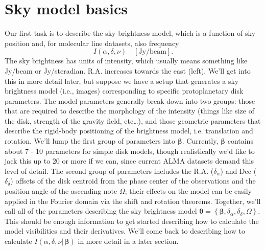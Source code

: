 \documentclass[modern]{aastex62}
\newcommand{\bbeta}{\boldsymbol{\beta}} %
\newcommand{\btheta}{\boldsymbol{\theta}} %
\begin{document}

\section{Sky model basics}
Our first task is to describe the sky brightness model, which is a function of sky position and, for molecular line datasets, also frequency
\begin{equation}
    I(\alpha, \delta, \nu) \quad [\mathrm{Jy/beam}].
\end{equation}
The sky brightness has units of intensity, which usually means something like Jy/beam or Jy/steradian. R.A. increases towards the east (left). We'll get into this in more detail later, but suppose we have a setup that generates a sky brightness model (i.e., images) corresponding to specific protoplanetary disk parameters. The model parameters generally break down into two groups: those that are required to describe the morphology of the intensity (things like size of the disk, strength of the gravity field, etc\ldots), and those geometric parameters that describe the rigid-body positioning of the brightness model, i.e. translation and rotation. We'll lump the first group of parameters into $\bbeta$. Currently, $\bbeta$ contains about 7 - 10 parameters for simple disk models, though realistically we'd like to jack this up to 20 or more if we can, since current ALMA datasets demand this level of detail. The second group of parameters includes the R.A. ($\delta_\alpha$) and Dec ($\delta_\delta$) offsets of the disk centroid from the phase center of the observations and the position angle of the ascending note $\Omega$; their effects on the model can be easily applied in the Fourier domain via the shift and rotation theorems. Together, we'll call all of the  parameters describing the sky brightness model $\btheta = \left \{ \bbeta, \delta_\alpha, \delta_\delta, \Omega \right \}$. This should be enough information to get started describing how to calculate the model visibilities and their derivatives. We'll come back to describing how to calculate $I(\alpha, \delta, \nu |\, \bbeta)$ in more detail in a later section.  
\end{document}
